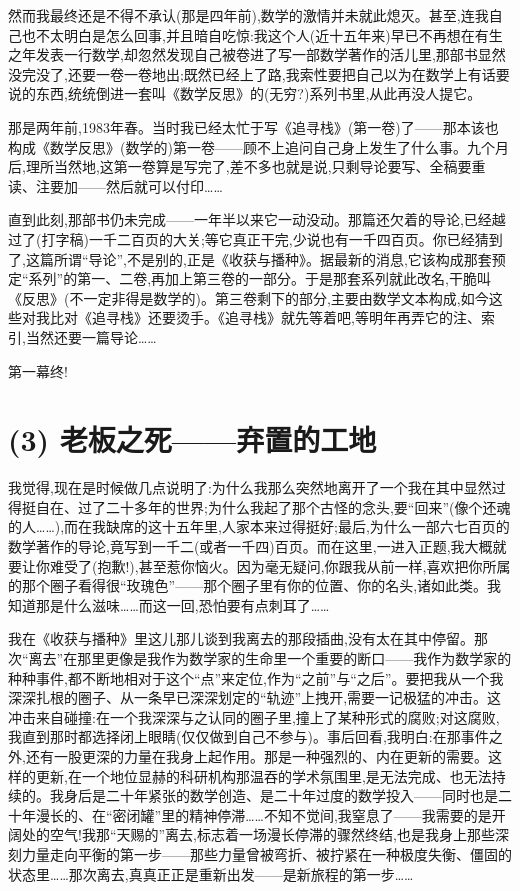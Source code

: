 然而我最终还是不得不承认(那是四年前),数学的激情并未就此熄灭。甚至,连我自己也不太明白是怎么回事,并且暗自吃惊:我这个人(近十五年来)早已不再想在有生之年发表一行数学,却忽然发现自己被卷进了写一部数学著作的活儿里,那部书显然没完没了,还要一卷一卷地出;既然已经上了路,我索性要把自己以为在数学上有话要说的东西,统统倒进一套叫《数学反思》的(无穷?)系列书里,从此再没人提它。

那是两年前,1983年春。当时我已经太忙于写《追寻栈》(第一卷)了——那本该也构成《数学反思》(数学的)第一卷——顾不上追问自己身上发生了什么事。九个月后,理所当然地,这第一卷算是写完了,差不多也就是说,只剩导论要写、全稿要重读、注要加——然后就可以付印……

直到此刻,那部书仍未完成——一年半以来它一动没动。那篇还欠着的导论,已经越过了(打字稿)一千二百页的大关;等它真正干完,少说也有一千四百页。你已经猜到了,这篇所谓“导论”,不是别的,正是《收获与播种》。据最新的消息,它该构成那套预定“系列”的第一、二卷,再加上第三卷的一部分。于是那套系列就此改名,干脆叫《反思》(不一定非得是数学的)。第三卷剩下的部分,主要由数学文本构成,如今这些对我比对《追寻栈》还要烫手。《追寻栈》就先等着吧,等明年再弄它的注、索引,当然还要一篇导论……

第一幕终!

\section{(3) 老板之死——弃置的工地}

我觉得,现在是时候做几点说明了:为什么我那么突然地离开了一个我在其中显然过得挺自在、过了二十多年的世界;为什么我起了那个古怪的念头,要“回来”(像个还魂的人……),而在我缺席的这十五年里,人家本来过得挺好;最后,为什么一部六七百页的数学著作的导论,竟写到一千二(或者一千四)百页。而在这里,一进入正题,我大概就要让你难受了(抱歉!),甚至惹你恼火。因为毫无疑问,你跟我从前一样,喜欢把你所属的那个圈子看得很“玫瑰色”——那个圈子里有你的位置、你的名头,诸如此类。我知道那是什么滋味……而这一回,恐怕要有点刺耳了……

我在《收获与播种》里这儿那儿谈到我离去的那段插曲,没有太在其中停留。那次“离去”在那里更像是我作为数学家的生命里一个重要的断口——我作为数学家的种种事件,都不断地相对于这个“点”来定位,作为“之前”与“之后”。要把我从一个我深深扎根的圈子、从一条早已深深划定的“轨迹”上拽开,需要一记极猛的冲击。这冲击来自碰撞:在一个我深深与之认同的圈子里,撞上了某种形式的腐败;对这腐败,我直到那时都选择闭上眼睛(仅仅做到自己不参与)。事后回看,我明白:在那事件之外,还有一股更深的力量在我身上起作用。那是一种强烈的、内在更新的需要。这样的更新,在一个地位显赫的科研机构那温吞的学术氛围里,是无法完成、也无法持续的。我身后是二十年紧张的数学创造、是二十年过度的数学投入——同时也是二十年漫长的、在“密闭罐”里的精神停滞……不知不觉间,我窒息了——我需要的是开阔处的空气!我那“天赐的”离去,标志着一场漫长停滞的骤然终结,也是我身上那些深刻力量走向平衡的第一步——那些力量曾被弯折、被拧紧在一种极度失衡、僵固的状态里……那次离去,真真正正是重新出发——是新旅程的第一步……

